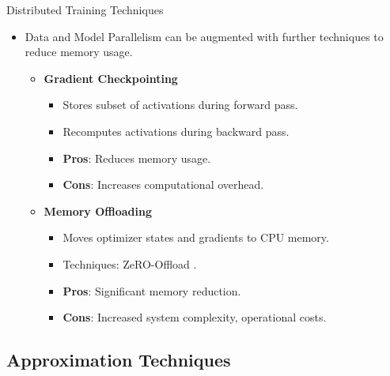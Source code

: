 \documentclass{beamer}
\begin{document}
\begin{frame}{Distributed Training Techniques}
    \begin{itemize}
        \item Data and Model Parallelism can be augmented with further techniques to reduce memory usage.
        \vspace{0.5em}
        \begin{itemize}
            \item \textbf{Gradient Checkpointing} \citep{chenTrainingDeepNets2016}
            \begin{itemize}
                \item Stores subset of activations during forward pass.
                \item Recomputes activations during backward pass.
                \item \textbf{Pros}: Reduces memory usage.
                \item \textbf{Cons}: Increases computational overhead.
            \end{itemize}
            \vspace{0.5em}
            \item \textbf{Memory Offloading}
            \begin{itemize}
                \item Moves optimizer states and gradients to CPU memory.
                \item Techniques: ZeRO-Offload \citep{rajbhandariZeROMemoryOptimizations2020}.
                \item \textbf{Pros}: Significant memory reduction.
                \item \textbf{Cons}: Increased system complexity, operational costs.
            \end{itemize}
        \end{itemize}
    \end{itemize}
\end{frame}

\subsection{Approximation Techniques}
\end{document}
